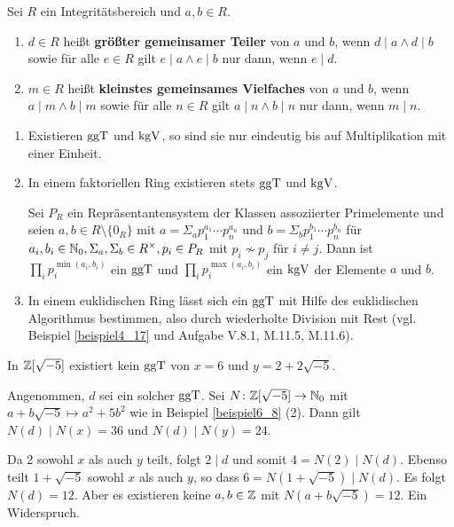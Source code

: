 \begin{definition}\label{definition6_15}
	Sei $R$ ein Integritätsbereich und $a,b \in R$.
	\begin{enumerate}[label=(\alph*)]
		\item $d \in R$ heißt \textbf{größter gemeinsamer Teiler} von $a$ und $b$, wenn $d \mid a \land d \mid b$ sowie für alle $e \in R$ gilt $e \mid a \land e \mid b$ nur dann, wenn $e \mid d$.
		\item $m \in R$ heißt  \textbf{kleinstes gemeinsames Vielfaches} von $a$ und $b$, wenn $a \mid m \land b \mid m$ sowie für alle $n \in R$ gilt $a \mid n \land b \mid n$ nur dann, wenn $m \mid n$.
	\end{enumerate}
\end{definition}
\begin{rem}\label{rem6_16}
	\begin{enumerate}[label=(\roman*)]
		\item Existieren $\mathrm{ggT}$ und $\mathrm{kgV}$, so sind sie nur eindeutig bis auf Multiplikation mit einer Einheit.
		\item In einem faktoriellen Ring existieren stets $\mathrm{ggT}$ und $\mathrm{kgV}$. 
		\begin{inlproof}
				Sei $P_R$ ein Repräsentantensystem der Klassen assoziierter Primelemente und seien $a,b \in R\setminus\{0_R\}$ mit $a = \Sigma_a p_1^{a_1} \cdots p_n^{a_n}$ und $b = \Sigma_b p_1^{b_1} \cdots p_n^{b_n}$ für $a_i,b_i \in \mathbb{N}_0, \Sigma_a, \Sigma_b \in R^\times, p_i \in P_R$ mit $p_i \not\sim p_j$ für $i \neq j$. Dann ist $\prod_i p_i^{\min(a_i,b_i)}$ ein $\mathrm{ggT}$ und $\prod_i p_i^{\max(a_i,b_i)}$ ein $\mathrm{kgV}$ der Elemente $a$ und $b$.
		\end{inlproof}
		
		\item In einem euklidischen Ring lässt sich ein $\mathrm{ggT}$ mit Hilfe des euklidischen Algorithmus bestimmen, also durch wiederholte Division mit Rest (vgl. Beispiel \ref{beispiel4_17} und Aufgabe V.8.1, M.11.5, M.11.6).
	\end{enumerate}
\end{rem}
\begin{beispiel}\label{beispiel6_17}
	In $\mathbb{Z}[\sqrt{-5}]$ existiert kein $\mathrm{ggT}$ von $x = 6$ und $y = 2 + 2\sqrt{-5}$.
	\begin{inlproof}
	Angenommen, $d$ sei ein solcher $\mathrm{ggT}$. Sei $N \colon \mathbb{Z}[\sqrt{-5}] \to \mathbb{N}_0$ mit $a + b \sqrt{-5} \mapsto a^2 + 5b^2$ wie in Beispiel \ref{beispiel6_8} (2). Dann gilt $N(d) \mid N(x) = 36$ und $N(d) \mid N(y) = 24$.
	
	Da 2 sowohl $x$ als auch $y$ teilt, folgt $2 \mid d$ und somit $4 = N(2) \mid N(d)$. Ebenso teilt $1 + \sqrt{-5}$ sowohl $x$ als auch $y$, so dass $6 = N(1 + \sqrt{-5}) \mid N(d)$. Es folgt $N(d)= 12$. Aber es existieren keine $a,b \in \mathbb{Z}$ mit $N(a + b\sqrt{-5}) = 12$. Ein Widerspruch.
	\end{inlproof}
\end{beispiel}

